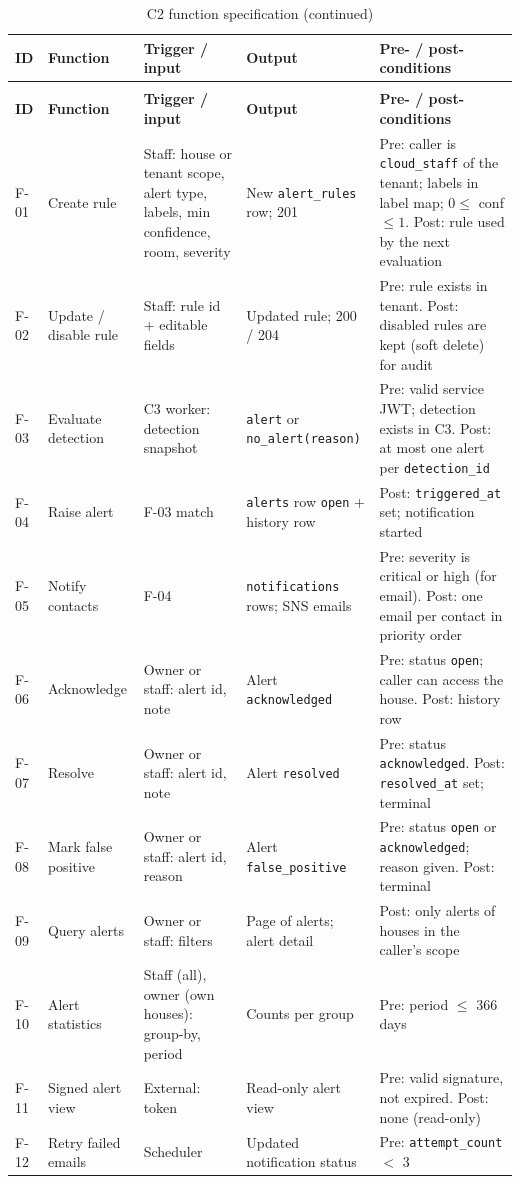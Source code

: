 \begin{longtable}{L{1.2cm}L{2.5cm}L{3.2cm}L{3.6cm}L{4.4cm}}
\caption{C2 function specification}\label{tab:c2-funcspec}\\
\toprule
\textbf{ID} & \textbf{Function} & \textbf{Trigger / input} & \textbf{Output} & \textbf{Pre- / post-conditions} \\
\midrule
\endfirsthead
\caption[]{C2 function specification (continued)}\\
\toprule
\textbf{ID} & \textbf{Function} & \textbf{Trigger / input} & \textbf{Output} & \textbf{Pre- / post-conditions} \\
\midrule
\endhead
F-01 & Create rule & Staff: house or tenant scope, alert type, labels, min confidence, room, severity & New \texttt{alert\_rules} row; 201 & Pre: caller is \texttt{cloud\_staff} of the tenant; labels in label map; $0\le$ conf $\le 1$. Post: rule used by the next evaluation \\
F-02 & Update / disable rule & Staff: rule id + editable fields & Updated rule; 200 / 204 & Pre: rule exists in tenant. Post: disabled rules are kept (soft delete) for audit \\
F-03 & Evaluate detection & C3 worker: detection snapshot & \texttt{alert} or \texttt{no\_alert(reason)} & Pre: valid service JWT; detection exists in C3. Post: at most one alert per \texttt{detection\_id} \\
F-04 & Raise alert & F-03 match & \texttt{alerts} row \texttt{open} + history row & Post: \texttt{triggered\_at} set; notification started \\
F-05 & Notify contacts & F-04 & \texttt{notifications} rows; SNS emails & Pre: severity is critical or high (for email). Post: one email per contact in priority order \\
F-06 & Acknowledge & Owner or staff: alert id, note & Alert \texttt{acknowledged} & Pre: status \texttt{open}; caller can access the house. Post: history row \\
F-07 & Resolve & Owner or staff: alert id, note & Alert \texttt{resolved} & Pre: status \texttt{acknowledged}. Post: \texttt{resolved\_at} set; terminal \\
F-08 & Mark false positive & Owner or staff: alert id, reason & Alert \texttt{false\_positive} & Pre: status \texttt{open} or \texttt{acknowledged}; reason given. Post: terminal \\
F-09 & Query alerts & Owner or staff: filters & Page of alerts; alert detail & Post: only alerts of houses in the caller's scope \\
F-10 & Alert statistics & Staff (all), owner (own houses): group-by, period & Counts per group & Pre: period $\le$ 366 days \\
F-11 & Signed alert view & External: token & Read-only alert view & Pre: valid signature, not expired. Post: none (read-only) \\
F-12 & Retry failed emails & Scheduler & Updated notification status & Pre: \texttt{attempt\_count} $<$ 3 \\
\bottomrule
\end{longtable}

